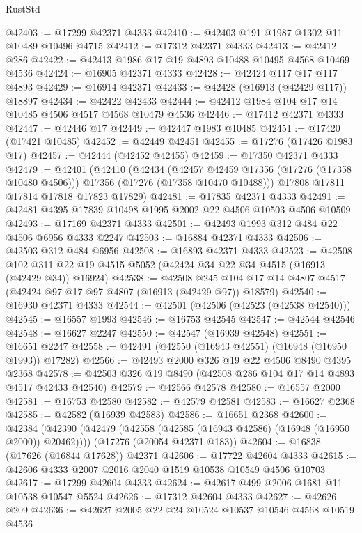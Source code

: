 \begin{lexlean}{RustStd}
\begin{coremodule}
@42403 := @17299 @42371 @4333
@42410 := @42403 @191 @1987 @1302 @11 @10489 @10496 @4715
@42412 := @17312 @42371 @4333
@42413 := @42412 @286
@42422 := @42413 @1986 @17 @19 @4893 @10488 @10495 @4568 @10469 @4536
@42424 := @16905 @42371 @4333
@42428 := @42424 @117 @17 @117 @4893
@42429 := @16914 @42371
@42433 := @42428 (@16913 (@42429 @117)) @18897
@42434 := @42422 @42433
@42444 := @42412 @1984 @104 @17 @14 @10485 @4506 @4517 @4568 @10479 @4536
@42446 := @17412 @42371 @4333
@42447 := @42446 @17
@42449 := @42447 @1983 @10485
@42451 := @17420 (@17421 @10485)
@42452 := @42449 @42451
@42455 := @17276 (@17426 @1983 @17)
@42457 := @42444 (@42452 @42455)
@42459 := @17350 @42371 @4333
@42479 := @42401
    (@42410
      (@42434
        (@42457 @42459 @17356 (@17276 (@17358 @10480 @4506)))
        @17356
        (@17276 (@17358 @10470 @10488)))
      @17808
      @17811
      @17814
      @17818
      @17823
      @17829)
@42481 := @17835 @42371 @4333
@42491 := @42481 @4395 @17839 @10498 @1995 @2002 @22 @4506 @10503 @4506 @10509
@42493 := @17169 @42371 @4333
@42501 := @42493 @1993 @312 @484 @22 @4506 @6956 @4333 @2247
@42503 := @16884 @42371 @4333
@42506 := @42503 @312 @484 @6956
@42508 := @16893 @42371 @4333
@42523 := @42508
    @102
    @311
    @22
    @19
    @4515
    @5052
    (@42424 @34 @22 @34 @4515 (@16913 (@42429 @34)) @16924)
@42538 := @42508
    @245
    @104
    @17
    @14
    @4807
    @4517
    (@42424 @97 @17 @97 @4807 (@16913 (@42429 @97)) @18579)
@42540 := @16930 @42371 @4333
@42544 := @42501 (@42506 (@42523 (@42538 @42540)))
@42545 := @16557 @1993
@42546 := @16753 @42545
@42547 := @42544 @42546
@42548 := @16627 @2247
@42550 := @42547 (@16939 @42548)
@42551 := @16651 @2247
@42558 := @42491 (@42550 (@16943 @42551) (@16948 (@16950 @1993)) @17282)
@42566 := @42493 @2000 @326 @19 @22 @4506 @8490 @4395 @2368
@42578 := @42503 @326 @19 @8490 (@42508 @286 @104 @17 @14 @4893 @4517 @42433 @42540)
@42579 := @42566 @42578
@42580 := @16557 @2000
@42581 := @16753 @42580
@42582 := @42579 @42581
@42583 := @16627 @2368
@42585 := @42582 (@16939 @42583)
@42586 := @16651 @2368
@42600 := @42384
    (@42390 (@42479 (@42558 (@42585 (@16943 @42586) (@16948 (@16950 @2000)) @20462))))
    (@17276 (@20054 @42371 @183))
@42604 := @16838 (@17626 (@16844 @17628)) @42371
@42606 := @17722 @42604 @4333
@42615 := @42606 @4333 @2007 @2016 @2040 @1519 @10538 @10549 @4506 @10703
@42617 := @17299 @42604 @4333
@42624 := @42617 @499 @2006 @1681 @11 @10538 @10547 @5524
@42626 := @17312 @42604 @4333
@42627 := @42626 @209
@42636 := @42627 @2005 @22 @24 @10524 @10537 @10546 @4568 @10519 @4536

\end{coremodule}
\end{lexlean}
